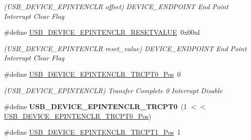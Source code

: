 \begin{DoxyCompactItemize}
\begin{DoxyCompactList}\small\item\em (U\+S\+B\+\_\+\+D\+E\+V\+I\+C\+E\+\_\+\+E\+P\+I\+N\+T\+E\+N\+C\+L\+R offset) D\+E\+V\+I\+C\+E\+\_\+\+E\+N\+D\+P\+O\+I\+N\+T End Point Interrupt Clear Flag \end{DoxyCompactList}\item 
\hypertarget{group___s_a_m_l21___u_s_b_gabf49468e9c86ee59100adb4a9c864037}{}\#define \hyperlink{group___s_a_m_l21___u_s_b_gabf49468e9c86ee59100adb4a9c864037}{U\+S\+B\+\_\+\+D\+E\+V\+I\+C\+E\+\_\+\+E\+P\+I\+N\+T\+E\+N\+C\+L\+R\+\_\+\+R\+E\+S\+E\+T\+V\+A\+L\+U\+E}~0x00ul\label{group___s_a_m_l21___u_s_b_gabf49468e9c86ee59100adb4a9c864037}

\begin{DoxyCompactList}\small\item\em (U\+S\+B\+\_\+\+D\+E\+V\+I\+C\+E\+\_\+\+E\+P\+I\+N\+T\+E\+N\+C\+L\+R reset\+\_\+value) D\+E\+V\+I\+C\+E\+\_\+\+E\+N\+D\+P\+O\+I\+N\+T End Point Interrupt Clear Flag \end{DoxyCompactList}\item 
\hypertarget{group___s_a_m_l21___u_s_b_ga8aecc1fe00ed6d981d1ffe46255b843b}{}\#define \hyperlink{group___s_a_m_l21___u_s_b_ga8aecc1fe00ed6d981d1ffe46255b843b}{U\+S\+B\+\_\+\+D\+E\+V\+I\+C\+E\+\_\+\+E\+P\+I\+N\+T\+E\+N\+C\+L\+R\+\_\+\+T\+R\+C\+P\+T0\+\_\+\+Pos}~0\label{group___s_a_m_l21___u_s_b_ga8aecc1fe00ed6d981d1ffe46255b843b}

\begin{DoxyCompactList}\small\item\em (U\+S\+B\+\_\+\+D\+E\+V\+I\+C\+E\+\_\+\+E\+P\+I\+N\+T\+E\+N\+C\+L\+R) Transfer Complete 0 Interrupt Disable \end{DoxyCompactList}\item 
\hypertarget{group___s_a_m_l21___u_s_b_gaf352383baefa4d497e79367fb06f1cae}{}\#define {\bfseries U\+S\+B\+\_\+\+D\+E\+V\+I\+C\+E\+\_\+\+E\+P\+I\+N\+T\+E\+N\+C\+L\+R\+\_\+\+T\+R\+C\+P\+T0}~(1 $<$$<$ \hyperlink{group___s_a_m_l21___u_s_b_ga8aecc1fe00ed6d981d1ffe46255b843b}{U\+S\+B\+\_\+\+D\+E\+V\+I\+C\+E\+\_\+\+E\+P\+I\+N\+T\+E\+N\+C\+L\+R\+\_\+\+T\+R\+C\+P\+T0\+\_\+\+Pos})\label{group___s_a_m_l21___u_s_b_gaf352383baefa4d497e79367fb06f1cae}

\item 
\hypertarget{group___s_a_m_l21___u_s_b_gaae736286cfbb572fcea8e5d21ca08658}{}\#define \hyperlink{group___s_a_m_l21___u_s_b_gaae736286cfbb572fcea8e5d21ca08658}{U\+S\+B\+\_\+\+D\+E\+V\+I\+C\+E\+\_\+\+E\+P\+I\+N\+T\+E\+N\+C\+L\+R\+\_\+\+T\+R\+C\+P\+T1\+\_\+\+Pos}~1\label{group___s_a_m_l21___u_s_b_gaae736286cfbb572fcea8e5d21ca08658}


\end{DoxyCompactItemize}
